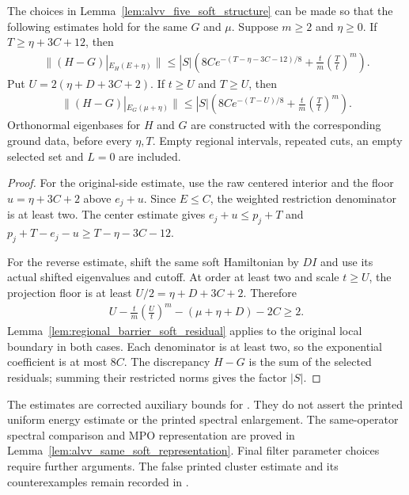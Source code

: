 \begin{lemma}
    \label{lem:alvv_five_soft_residuals}
    \leanok
    The choices in Lemma~\ref{lem:alvv_five_soft_structure} can be made
    so that the following estimates hold for the same $G$ and $\mu$.
    Suppose $m\geq2$ and $\eta\geq0$. If $T\geq\eta+3C+12$, then
    \begin{align}
        \|(H-G)|_{E_H(E+\eta)}\|
        \leq |S|\left(8C e^{-(T-\eta-3C-12)/8}
        +\frac{t}{m}\left(\frac Tt\right)^m\right).
    \end{align}
    Put $U=2(\eta+D+3C+2)$. If $t\geq U$ and $T\geq U$, then
    \begin{align}
        \|(H-G)|_{E_G(\mu+\eta)}\|
        \leq |S|\left(8C e^{-(T-U)/8}
        +\frac{t}{m}\left(\frac Tt\right)^m\right).
    \end{align}
    Orthonormal eigenbases for $H$ and $G$ are constructed with the
    corresponding ground data, before every $\eta,T$. Empty regional intervals,
    repeated cuts, an empty selected set and $L=0$ are included.
\end{lemma}
\begin{proof}\leanok
    For the original-side estimate, use the raw centered interior
    and the floor $u=\eta+3C+2$ above $e_j+u$.
    Since $E\leq C$, the weighted restriction denominator is at
    least two. The center estimate gives
    $e_j+u\leq p_j+T$ and
    $p_j+T-e_j-u\geq T-\eta-3C-12$.

    For the reverse estimate, shift the same soft Hamiltonian by
    $DI$ and use its actual shifted eigenvalues and cutoff.
    At order at least two and scale $t\geq U$, the projection floor
    is at least $U/2=\eta+D+3C+2$. Therefore
    \begin{align}
        U-\frac{t}{m}\left(\frac Ut\right)^m
        -(\mu+\eta+D)-2C\geq2.
    \end{align}
    Lemma~\ref{lem:regional_barrier_soft_residual} applies to the
    original local boundary in both cases. Each denominator is at
    least two, so the exponential coefficient is at most $8C$.
    The discrepancy $H-G$ is the sum of the selected residuals;
    summing their restricted norms gives the factor $|S|$.
\end{proof}

The estimates are corrected auxiliary bounds for
\cite[lines 1178--1255 and 1373--1392]{Arad2016RigorousRG}.
They do not assert the printed uniform energy estimate or the printed
spectral enlargement. The same-operator spectral comparison and MPO representation are proved
in Lemma~\ref{lem:alvv_same_soft_representation}. Final filter parameter
choices require further arguments. The false printed
cluster estimate and its counterexamples remain recorded in
\cite{gap:alvv16_cluster_approximation}.
